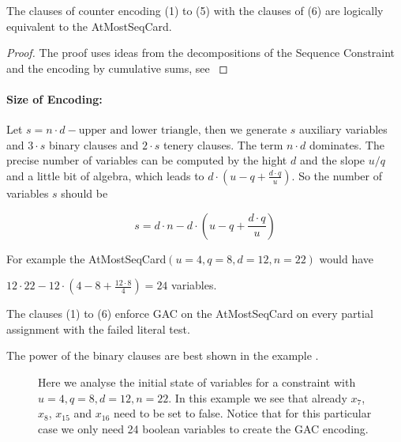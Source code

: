 \documentclass[]{llncs}
\begin{document}
\begin{theorem}
    The clauses of counter encoding (1) to (5) with the clauses of (6)
    are logically equivalent to the AtMostSeqCard.
\end{theorem}

\begin{proof}
    The proof uses ideas from the decompositions of the Sequence
    Constraint and the encoding by cumulative sums, see \cite{Brand07}
\end{proof}


\paragraph{Size of Encoding: } Let $s = n\cdot d-\text{upper and lower
triangle}$, then we generate $s$ auxiliary variables and $3\cdot s$
binary clauses and $2\cdot s$ tenery clauses. The term $n\cdot d$
dominates. The precise number of variables can be computed by the hight
$d$ and the slope $u/q$ and a little bit of algebra, which leads to
$d\cdot(u-q+\frac{d \cdot q}{u}) $. So the number of variables $s$
should be

$$ s = d \cdot n - d \cdot(u-q+\frac{d \cdot q}{u}) $$

For example the AtMostSeqCard$(u=4,q=8,d=12,n=22)$ would have 

$ 12\cdot 22- 12\cdot ( 4-8+\frac{12 \cdot 8}{4}) = 24$ variables. 

\begin{conjecture}
    The clauses (1) to (6) enforce GAC on the AtMostSeqCard on every
    partial assignment with the failed literal test. 
\end{conjecture}

%

The power of the binary clauses are best shown in the example 
\cite{Siala12}.


\begin{figure}
\centering 
\caption{Here we analyse the initial state of variables for a constraint
    with $u=4,q=8,d=12,n=22$. In this example we see that already
    $x_{7}$, $x_{8}$, $x_{15}$ and $x_{16}$ need to be set to false.
    Notice that for this particular case we only need 24 boolean
    variables to create the GAC encoding.}
%
\end{figure}
\end{document}
